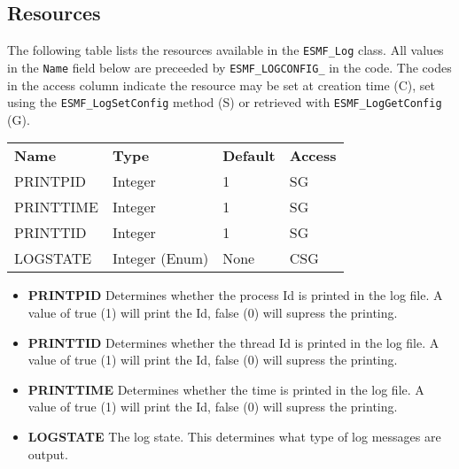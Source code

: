 \subsection{Resources}

The following table lists the resources available in the {\tt ESMF\_Log} class.
All values in the {\tt Name} field below are preceeded by {\tt ESMF\_LOGCONFIG\_}
in the code.  The codes in the access column indicate the resource may be set at
creation time (C), set using the {\tt ESMF\_LogSetConfig} method (S) or retrieved with 
{\tt ESMF\_LogGetConfig} (G).

\begin{tabular}{llll} 
{\bf Name}		& {\bf Type}		& {\bf Default}		& {\bf Access} \\
PRINTPID		& Integer		& 1 			& SG \\	
PRINTTIME		& Integer		& 1 			& SG \\
PRINTTID		& Integer		& 1 			& SG \\
LOGSTATE		& Integer (Enum)	& None			& CSG 

\end{tabular}

\begin{itemize}

\item{\bf PRINTPID} 
Determines whether the process Id is printed in the log file.  A value of true (1) 
will print the Id, false (0) will supress the printing.

\item{\bf PRINTTID} 
Determines whether the thread Id is printed in the log file.  A value of true (1) 
will print the Id, false (0) will supress the printing.

\item{\bf PRINTTIME} 
Determines whether the time is printed in the log file.  A value of true (1) 
will print the Id, false (0) will supress the printing.

\item{\bf LOGSTATE}
The log state.  This determines what type of log messages are output.

\end{itemize}

